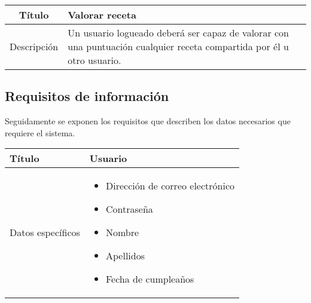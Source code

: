 \begin{center}
  
  \begin{tabularx}{\textwidth}{|c|X|}
    \hline
    Título & Valorar receta \\

    \hline

    Descripción & Un usuario logueado deberá ser capaz de valorar con una
    puntuación cualquier receta compartida por él u otro usuario. \\

    \hline
  \end{tabularx}
\end{center}


\subsection{Requisitos de información}
\label{sec:requisitos-informacion}

Seguidamente se exponen los requisitos que describen los datos necesarios que
requiere el sistema.

\begin{center}
  
  \begin{tabularx}{\textwidth}{|l|X|}
    \hline

    Título & Usuario\\

    \hline
    Datos específicos &

    \begin{itemize}
    \item Dirección de correo electrónico
    \item Contraseña
    \item Nombre
    \item Apellidos
    \item Fecha de cumpleaños
    \end{itemize}
    \\
    
    \hline
    
  \end{tabularx}
\end{center}


